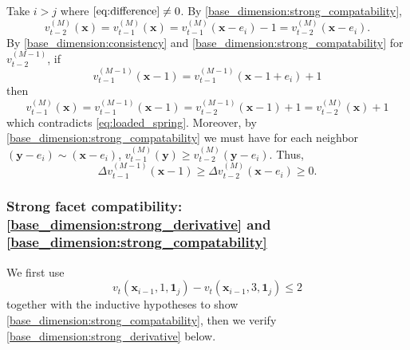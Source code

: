 \documentclass[12pt]{amsart}
\begin{document}
Take $i > j$ where $\eqref{eq:difference} \not = 0$. By \eqref{base_dimension:strong_compatability}, 
\begin{equation} \label{eq:loaded_spring}
v_{t-2}^{(M)}(\mathbf{x}) =  v_{t-1}^{(M)}(\mathbf{x}) =  v_{t-1}^{(M)}(\mathbf{x}-e_i)-1 = v_{t-2}^{(M)}(\mathbf{x}-e_i).
\end{equation}
By \eqref{base_dimension:consistency} and \eqref{base_dimension:strong_compatability} for $v_{t-2}^{(M-1)}$, if
\[
v_{t-1}^{(M-1)}(\mathbf{x}-1) =  v_{t-1}^{(M-1)}(\mathbf{x}-1+e_i)+1
\]
then 
\[
v_{t-1}^{(M)}(\mathbf{x}) = v_{t-1}^{(M-1)}(\mathbf{x}-1) =  v_{t-2}^{(M-1)}(\mathbf{x}-1)+1 = v_{t-2}^{(M)}(\mathbf{x}) + 1
\]
which contradicts \eqref{eq:loaded_spring}. Moreover, 
by \eqref{base_dimension:strong_compatability}
we must have for each neighbor $(\mathbf{y}-e_i) \sim (\mathbf{x} - e_i)$, $v_{t-1}^{(M)}(\mathbf{y}) \geq v_{t-2}^{(M)}(\mathbf{y}-e_i)$. Thus, 
\begin{equation} 
\Delta v_{t-1}^{(M-1)}(\mathbf{x}-1) \geq  \Delta v_{t-2}^{(M)}(\mathbf{x}-e_i) \geq 0.
\end{equation}



\subsubsection*{Strong facet compatibility: \eqref{base_dimension:strong_derivative} and \eqref{base_dimension:strong_compatability}} 
We first use
\begin{equation} \label{eq:two_derivative_bound}
v_t(\mathbf{x}_{i-1}, 1, \mathbf{1}_j) - v_t(\mathbf{x}_{i-1},3, \mathbf{1}_j) \leq 2
\end{equation}
together with the inductive hypotheses 
to show \eqref{base_dimension:strong_compatability}, then we verify \eqref{base_dimension:strong_derivative} below. 
\end{document}
